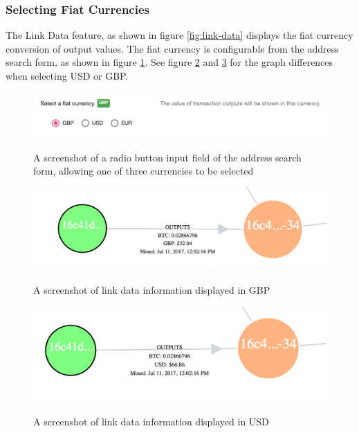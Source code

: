 \subsubsection{Selecting Fiat Currencies}
The Link Data feature, as shown in figure \ref{fig:link-data} displays the fiat currency conversion of output values. The fiat currency is configurable from the address search form, as shown in figure \ref{fig:select-fiat-currencies}. See figure \ref{fig:select-fiat-currencies-gbp} and \ref{fig:select-fiat-currencies-usd} for the graph differences when selecting USD or GBP. 

\begin{figure}[h!]
  \centering
  \includegraphics[width = 15cm]{./figures/ui-screenshots/fiat-currency-selection}\\[0.5cm] 
  \caption{A screenshot of a radio button input field of the address search form, allowing one of three currencies to be selected}
  \label{fig:select-fiat-currencies}
\end{figure}
\begin{figure}[h!]
  \centering
  \includegraphics[width = 15cm]{./figures/ui-screenshots/fiat-currency-link-gbp}\\[0.5cm] 
  \caption{A screenshot of link data information displayed in GBP}
  \label{fig:select-fiat-currencies-gbp}
\end{figure}
\begin{figure}[h!]
  \centering
  \includegraphics[width = 15cm]{./figures/ui-screenshots/fiat-currency-link-usd}\\[0.5cm] 
  \caption{A screenshot of link data information displayed in USD}
  \label{fig:select-fiat-currencies-usd}
\end{figure}

